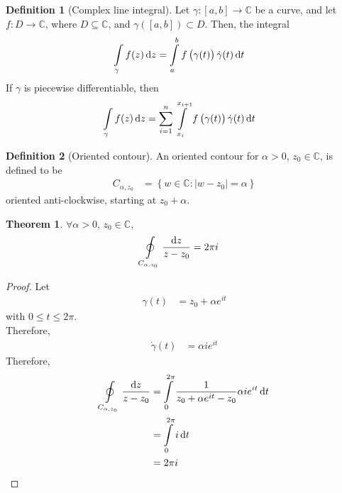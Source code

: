 \documentclass[titlepage, fleqn, a4paper, 12pt, twoside]{article}
\theoremstyle{definition}
\newtheorem{definition}{Definition}
\theoremstyle{theorem}
\newtheorem{theorem}{Theorem}
\begin{document}
\begin{definition}[Complex line integral]
	Let $\gamma : [a,b] \to \mathbb{C}$ be a curve, and let $f : D \to \mathbb{C}$, where $D \subseteq \mathbb{C}$, and $\gamma\left( [a,b] \right) \subset D$.
	Then, the integral
	\begin{align*}
		\int\limits_{\gamma} f(z) \dif z & = \int\limits_{a}^{b} f\left( \gamma(t) \right) \dot{\gamma}(t) \dif t
	\end{align*}
	If $\gamma$ is piecewise differentiable, then
	\begin{align*}
		\int\limits_{\gamma} f(z) \dif z & = \sum\limits_{i = 1}^{n} \int\limits_{x_i}^{x_{i + 1}} f\left( \gamma(t) \right) \dot{\gamma}(t) \dif t
	\end{align*}
\end{definition}

\begin{definition}[Oriented contour]
	An oriented contour for $\alpha > 0$, $z_0 \in \mathbb{C}$, is defined to be
	\begin{align*}
		C_{\alpha,z_0} & = \left\{ w \in \mathbb{C} : |w - z_0| = \alpha \right\}
	\end{align*}
	oriented anti-clockwise, starting at $z_0 + \alpha$.
\end{definition}

\begin{theorem}
	$\forall \alpha > 0$, $z_0 \in \mathbb{C}$,
	\begin{align*}
		\oint\limits_{C_{\alpha,z_0}} \frac{\dif z}{z - z_0} & = 2 \pi i
	\end{align*}
\end{theorem}

\begin{proof}
	Let
	\begin{align*}
		\gamma(t) & = z_0 + \alpha e^{i t}
	\end{align*}
	with $0 \le t \le 2 \pi$.\\
	Therefore,
	\begin{align*}
		\dot{\gamma}(t) & = \alpha i e^{i t}
	\end{align*}
	Therefore,
	\begin{align*}
		\oint\limits_{C_{\alpha,z_0}} \frac{\dif z}{z - z_0} & = \int\limits_{0}^{2 \pi} \frac{1}{z_0 + \alpha e^{i t} - z_0} \alpha i e^{i t} \dif t \\
                                                                     & = \int\limits_{0}^{2 \pi} i \dif t                                                     \\
                                                                     & = 2 \pi i
	\end{align*}
\end{proof}
\end{document}
